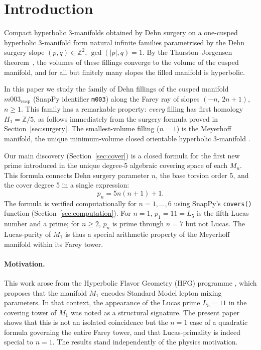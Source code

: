 \documentclass[11pt,a4paper]{article}
\theoremstyle{definition}
\newcommand{\ZZ}{\mathbb{Z}}
\newcommand{\Zfive}{\ZZ/5}
\newcommand{\Mn}{M_n}
\newcommand{\Mcusp}{m003_{\mathrm{cusp}}}
\begin{document}
\section{Introduction}
\label{sec:intro}

Compact hyperbolic 3-manifolds obtained by Dehn surgery on a
one-cusped hyperbolic 3-manifold form natural infinite families
parametrised by the Dehn surgery slope $(p,q) \in \ZZ^2$,
$\gcd(|p|,q)=1$.
By the Thurston--Jorgensen theorem~\cite{Thurston78}, the volumes
of these fillings converge to the volume of the cusped manifold,
and for all but finitely many slopes the filled manifold is hyperbolic.

In this paper we study the family of Dehn fillings of the cusped
manifold $\Mcusp$ (SnapPy identifier \texttt{m003}) along the
Farey ray of slopes $(-n,\,2n+1)$, $n \geq 1$.
This family has a remarkable property: \emph{every} filling has
first homology $H_1 = \Zfive$, as follows immediately from the
surgery formula proved in Section~\ref{sec:surgery}.
The smallest-volume filling ($n=1$) is the Meyerhoff manifold,
the unique minimum-volume closed orientable hyperbolic 3-manifold
\cite{GMM2009}.

Our main discovery (Section~\ref{sec:cover}) is a closed formula
for the first new prime introduced in the unique degree-5 algebraic
covering space of each $\Mn$.
This formula connects Dehn surgery parameter $n$, the base torsion
order 5, and the cover degree 5 in a single expression:
\[
  p_n = 5n(n+1)+1.
\]
The formula is verified computationally for $n = 1,\ldots,6$
using SnapPy's \texttt{covers()} function
(Section~\ref{sec:computation}).
For $n=1$, $p_1 = 11 = L_5$ is the fifth Lucas number and a prime;
for $n \geq 2$, $p_n$ is prime through $n=7$ but not Lucas.
The Lucas-purity of $M_1$ is thus a special arithmetic property
of the Meyerhoff manifold within its Farey tower.

\paragraph{Motivation.}
This work arose from the Hyperbolic Flavor Geometry (HFG) programme
\cite{Gentry:Unified}, which proposes that the manifold $M_1$ encodes
Standard Model lepton mixing parameters.
In that context, the appearance of the Lucas prime $L_5 = 11$ in the
covering tower of $M_1$ was noted as a structural signature.
The present paper shows that this is not an isolated coincidence but
the $n=1$ case of a quadratic formula governing the entire Farey tower,
and that Lucas-primality is indeed special to $n=1$.
The results stand independently of the physics motivation.
\end{document}
